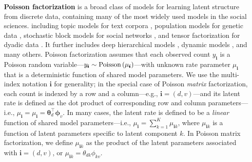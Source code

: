 \documentclass{article}
\newcommand{\subs}{\pmb{i}}
\newcommand{\ys}{y_{\subs}}
\newcommand{\mus}{\mu_{\subs}}
\newcommand{\musk}{\mu_{\subs k}}
\newcommand{\Pois}[1]{\textup{Poisson}\left( #1 \right)}
\newcommand{\teq}{\!=\!}
\begin{document}
  \textbf{Poisson factorization}
  \citep{titsias2008infinite,cemgil2009bayesian,zhou2012augment,gopalan2013efficient,paisley2014bayesian}
  is a broad class of models for learning latent structure from discrete data,
  containing many of the most widely used models in the social sciences.
  including topic models for text corpora
  \citep{blei2003latent,buntine2004applying,canny2004gap}, population models
  for genetic data \citep{pritchard2000inference}, stochastic block models for
  social networks
  \citep{ball2011efficient,gopalan2013efficient,zhou2015infinite}, and tensor
  factorization for dyadic data
  \citep{welling2001positive,chi2012tensors,schmidt2013nonparametric,schein2015bayesian,schein2016bayesian}.
  It further includes deep hierarchical models
  \citep{ranganath2015deep,zhou2015poisson}, dynamic models
  \citep{charlin2015dynamic,acharya2015nonparametric,schein2016pgds}, and many
  others.
  Poisson factorization assumes that each observed count $\ys$ is a Poisson
  random variable---$\ys \sim \Pois{\mus}$---with unknown rate parameter $\mus$
  that is a deterministic function of shared model parameters. We use the
  multi-index notation $\subs$ for generality; in the special case of Poisson
  \emph{matrix} factorization, each count is indexed by a row and a
  column---e.g., $\subs \!=\! (d, v)$---and its latent rate is defined as the
  dot product of corresponding row and column parameters---i.e., $\mus \teq
  \mu_{\subs} \teq \boldsymbol{\theta}_d^{\top} \boldsymbol{\phi}_v$. In many
  cases, the latent rate is defined to be a \emph{linear} function of shared
  model parameters---i.e., $\mus = \sum_{k=1}^K \musk$, where $\musk$ is a
  function of latent parameters specific to latent component $k$. In Poisson
  matrix factorization, we define $\musk$ as the product of the latent
  parameters associated with $\subs = (d, v)$, or $\musk =
  \theta_{dk}\phi_{kv}$.
  
\end{document}
